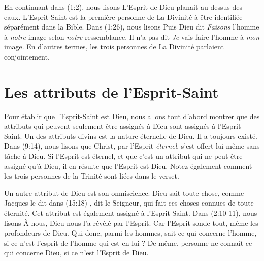 En continuant dans (1:2), nous lisons\frcolon{}
 \Og L'Esprit de Dieu planait au-dessus des eaux. \Fg{}
 L'Esprit-Saint est la première personne de La Divinité à être identifiée
 séparément dans la Bible.
 Dans (1:26), nous lisons\frcolon{}
 \Og Puis Dieu dit\frcolon{} \emph{Faisons} l'homme à \emph{notre} image
 selon \emph{notre} ressemblance. \Fg{}
 Il n'a pas dit\frcolon{} \Og \emph{Je} vais faire l'homme à \emph{mon} image. \Fg{}
 En d'autres termes, les trois personnes de La Divinité parlaient conjointement.

\section{Les attributs de l'Esprit-Saint}

Pour établir que l'Esprit-Saint est Dieu, nous allons tout d'abord montrer
 que des attributs qui peuvent seulement être assignés à Dieu sont assignés à
 l'Esprit-Saint.
 Un des attributs divins est la nature éternelle de Dieu.
 Il a toujours existé. Dans (9:14), nous lisons que \Og Christ,
 par l'Esprit \emph{éternel}, s'est offert lui-même sans tâche à Dieu. \Fg{}
 Si l'Esprit est éternel, et que c'est un attribut qui ne peut être assigné
 qu'à Dieu, il en résulte que l'Esprit est Dieu.
 Notez également comment les trois personnes de la Trinité sont liées
 dans le verset.

Un autre attribut de Dieu est son omniscience. Dieu sait toute chose, comme
 Jacques le dit dans (15:18)\frcolon{}
 \Og [\dots{}], dit le Seigneur, qui fait ces choses connues de toute 
 éternité. \Fg{}
 Cet attribut est également assigné à
 l'Esprit-Saint. Dans (2:10-11), nous lisons\frcolon{} \Og À nous, Dieu
 nous l'a révélé par l'Esprit. Car l'Esprit sonde tout, même les profondeurs de
 Dieu. Qui donc, parmi les hommes, sait ce qui concerne l'homme, si ce n'est
 l'esprit de l'homme qui est en lui ? De même, personne ne connaît ce qui
 concerne Dieu, si ce n'est l'Esprit de Dieu. \Fg{}

